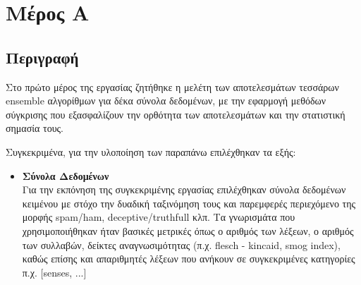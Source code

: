 \section{Μέρος Α}
\subsection{Περιγραφή}
Στο πρώτο μέρος της εργασίας ζητήθηκε η μελέτη των αποτελεσμάτων τεσσάρων ensemble
αλγορίθμων για δέκα σύνολα δεδομένων, με την εφαρμογή μεθόδων σύγκρισης που εξασφαλίζουν την ορθότητα των αποτελεσμάτων και την στατιστική σημασία τους. 

Συγκεκριμένα, για την υλοποίηση των παραπάνω επιλέχθηκαν τα εξής:

\begin{itemize}
	\item \textbf{Σύνολα Δεδομένων} \\
	Για την εκπόνηση της συγκεκριμένης εργασίας επιλέχθηκαν σύνολα δεδομένων κειμένου με στόχο την δυαδική ταξινόμηση τους και παρεμφερές περιεχόμενο της μορφής spam/ham, deceptive/truthfull κλπ. Τα γνωρισμάτα που χρησιμοποιήθηκαν ήταν βασικές μετρικές όπως ο αριθμός των λέξεων, ο αριθμός των συλλαβών, δείκτες αναγνωσιμότητας (π.χ. flesch - kincaid, smog index), καθώς επίσης και απαριθμητές λέξεων που ανήκουν σε συγκεκριμένες κατηγορίες π.χ. [senses, ...]
	

\end{itemize}
